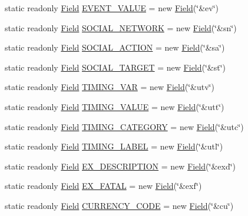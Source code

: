 \begin{DoxyCompactItemize}
\item 
static readonly \hyperlink{class_field}{Field} \hyperlink{class_fields_a7dbec7cb75ee0b5414ff74f0a13daee5}{E\+V\+E\+N\+T\+\_\+\+V\+A\+L\+UE} = new \hyperlink{class_field}{Field}(\char`\"{}\&ev\char`\"{})
\item 
static readonly \hyperlink{class_field}{Field} \hyperlink{class_fields_acd5d070f9f15806d7925ec423a021058}{S\+O\+C\+I\+A\+L\+\_\+\+N\+E\+T\+W\+O\+RK} = new \hyperlink{class_field}{Field}(\char`\"{}\&sn\char`\"{})
\item 
static readonly \hyperlink{class_field}{Field} \hyperlink{class_fields_a6c130c6864414b213914adabbb8ec5f8}{S\+O\+C\+I\+A\+L\+\_\+\+A\+C\+T\+I\+ON} = new \hyperlink{class_field}{Field}(\char`\"{}\&sa\char`\"{})
\item 
static readonly \hyperlink{class_field}{Field} \hyperlink{class_fields_af23c25fbeb2855a97bd3f52938d98fdc}{S\+O\+C\+I\+A\+L\+\_\+\+T\+A\+R\+G\+ET} = new \hyperlink{class_field}{Field}(\char`\"{}\&st\char`\"{})
\item 
static readonly \hyperlink{class_field}{Field} \hyperlink{class_fields_a1a325bc57bccc6d81de6047b6be140e0}{T\+I\+M\+I\+N\+G\+\_\+\+V\+AR} = new \hyperlink{class_field}{Field}(\char`\"{}\&utv\char`\"{})
\item 
static readonly \hyperlink{class_field}{Field} \hyperlink{class_fields_a1978d57e52e2a174cf73bea7c7daac91}{T\+I\+M\+I\+N\+G\+\_\+\+V\+A\+L\+UE} = new \hyperlink{class_field}{Field}(\char`\"{}\&utt\char`\"{})
\item 
static readonly \hyperlink{class_field}{Field} \hyperlink{class_fields_a9058bd9578370af07e850d8f4f5aaa9e}{T\+I\+M\+I\+N\+G\+\_\+\+C\+A\+T\+E\+G\+O\+RY} = new \hyperlink{class_field}{Field}(\char`\"{}\&utc\char`\"{})
\item 
static readonly \hyperlink{class_field}{Field} \hyperlink{class_fields_a6be4605603825070dc4d8baff5d7a927}{T\+I\+M\+I\+N\+G\+\_\+\+L\+A\+B\+EL} = new \hyperlink{class_field}{Field}(\char`\"{}\&utl\char`\"{})
\item 
static readonly \hyperlink{class_field}{Field} \hyperlink{class_fields_ab8838948541e9a811428608c666a9197}{E\+X\+\_\+\+D\+E\+S\+C\+R\+I\+P\+T\+I\+ON} = new \hyperlink{class_field}{Field}(\char`\"{}\&exd\char`\"{})
\item 
static readonly \hyperlink{class_field}{Field} \hyperlink{class_fields_a72846069360f8f5c13d1a9914d7eff06}{E\+X\+\_\+\+F\+A\+T\+AL} = new \hyperlink{class_field}{Field}(\char`\"{}\&exf\char`\"{})
\item 
static readonly \hyperlink{class_field}{Field} \hyperlink{class_fields_a3acde8e11e991cbae1837317cb5d8516}{C\+U\+R\+R\+E\+N\+C\+Y\+\_\+\+C\+O\+DE} = new \hyperlink{class_field}{Field}(\char`\"{}\&cu\char`\"{})

\end{DoxyCompactItemize}
